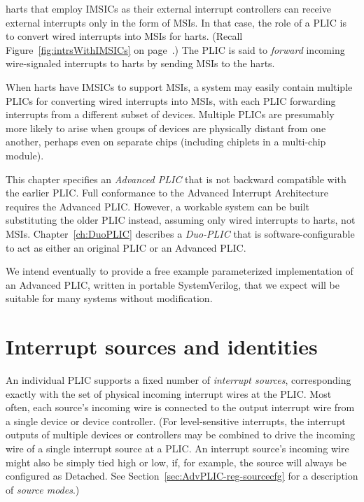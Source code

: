 {\RISCV} harts that employ IMSICs as their external interrupt
controllers can receive external interrupts only in the form of MSIs.
In that case, the role of a PLIC is to convert wired interrupts into
MSIs for harts.
(Recall Figure~\ref{fig:intrsWithIMSICs} on
page~\pageref{fig:intrsWithIMSICs}.)
The PLIC is said to \emph{forward} incoming wire-signaled interrupts to
harts by sending MSIs to the harts.

When harts have IMSICs to support MSIs, a system may easily contain
multiple PLICs for converting wired interrupts into MSIs, with each
PLIC forwarding interrupts from a different subset of devices.
Multiple PLICs are presumably more likely to arise when groups of
devices are physically distant from one another, perhaps even on
separate chips (including chiplets in a multi-chip module).

This chapter specifies an \emph{Advanced PLIC} that is not backward
compatible with the earlier {\RISCV} PLIC.
Full conformance to the Advanced Interrupt Architecture requires the
Advanced PLIC.
However, a workable system can be built substituting the older PLIC
instead, assuming only wired interrupts to harts, not MSIs.
Chapter~\ref{ch:DuoPLIC} describes a \emph{\mbox{Duo-PLIC\/}} that is
software-configurable to act as either an original {\RISCV} PLIC or an
Advanced PLIC.

\begin{commentary}
We intend eventually to provide a free example parameterized
implementation of an Advanced PLIC, written in portable SystemVerilog,
that we expect will be suitable for many {\RISCV} systems without
modification.
\end{commentary}

\section{Interrupt sources and identities}

An individual PLIC supports a fixed number of \emph{interrupt sources},
corresponding exactly with the set of physical incoming interrupt
wires at the PLIC.
Most often, each source's incoming wire is connected to the output
interrupt wire from a single device or device controller.
(For level-sensitive interrupts, the interrupt outputs of multiple
devices or controllers may be combined to drive the incoming wire of a
single interrupt source at a PLIC.
An interrupt source's incoming wire might also be simply tied high or
low, if, for example, the source will always be configured as Detached.
See Section~\ref{sec:AdvPLIC-reg-sourcecfg} for a description of
\emph{source modes}.)

